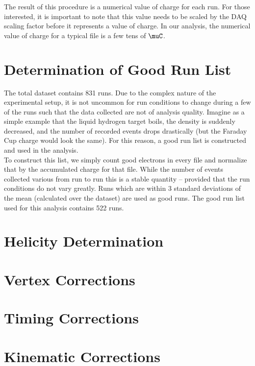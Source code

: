 The result of this procedure is a numerical value of charge for each run.  For those interested, it is important to note that this value needs to be scaled by the DAQ scaling factor before it represents a value of charge.  In our analysis, the numerical value of charge for a typical file is a few tens of $\muC$.

\section{Determination of Good Run List}
The total dataset contains 831 runs.  Due to the complex nature of the experimental setup, it is not uncommon for run conditions to change during a few of the runs such that the data collected are not of analysis quality.  Imagine as a simple example that the liquid hydrogen target boils, the density is suddenly decreased, and the number of recorded events drops drastically (but the Faraday Cup charge would look the same).  For this reason, a good run list is constructed and used in the analysis. \\

To construct this list, we simply count good electrons in every file and normalize that by the accumulated charge for that file.  While the number of events collected various from run to run this is a stable quantity -- provided that the run conditions do not vary greatly.  Runs which are within 3 standard deviations of the mean (calculated over the dataset) are used as good runs.  The good run list used for this analysis contains 522 runs.  

\section{Helicity Determination}

\section{Vertex Corrections}

\section{Timing Corrections}

\section{Kinematic Corrections}
